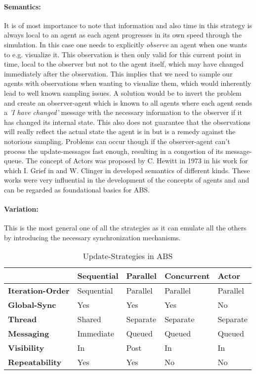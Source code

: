 \paragraph{Semantics:} It is of most importance to note that information and also time in this strategy is always local to an agent as each agent progresses in its own speed through the simulation. In this case one needs to explicitly \textit{observe} an agent when one wants to e.g. visualize it. This observation is then only valid for this current point in time, local to the observer but not to the agent itself, which may have changed immediately after the observation. This implies that we need to sample our agents with observations when wanting to visualize them, which would inherently lead to well known sampling issues. A solution would be to invert the problem and create an observer-agent which is known to all agents where each agent sends a \textit{'I have changed'} message with the necessary information to the observer if it has changed its internal state. This also does not guarantee that the observations will really reflect the actual state the agent is in but is a remedy against the notorious sampling. Problems can occur though if the observer-agent can't process the update-messages fast enough, resulting in a congestion of its message-queue. 
The concept of Actors was proposed by C. Hewitt in 1973 in his work \cite{hewitt_universal_1973} for which I. Grief in \cite{greif_semantics_1975} and W. Clinger in \cite{clinger_foundations_1981} developed semantics of different kinds. These works were very influential in the development of the concepts of agents and and can be regarded as foundational basics for ABS.

\paragraph{Variation:} This is the most general one of all the strategies as it can emulate all the others by introducing the necessary synchronization mechanisms.


\begin{table*}[t]
\centering
\caption{Update-Strategies in ABS}
\label{tab:update_strategies}
\begin{tabular}{l || l | l | l | l }
	 			& \textbf{Sequential} 	& \textbf{Parallel} 	& \textbf{Concurrent}	& \textbf{Actor}  	\\ \hline \hline

\textbf{Iteration-Order}	& Sequential	& Parallel	& Parallel		& Parallel	\\  
\textbf{Global-Sync}		& Yes			& Yes		& Yes			& No		\\  
\textbf{Thread}				& Shared		& Separate	& Separate		& Separate	\\  
\textbf{Messaging}			& Immediate		& Queued	& Queued		& Queued	\\  
\textbf{Visibility}			& In			& Post		& In			& In		\\  
\textbf{Repeatability}		& Yes			& Yes		& No			& No		\\ 

\end{tabular}
\end{table*}